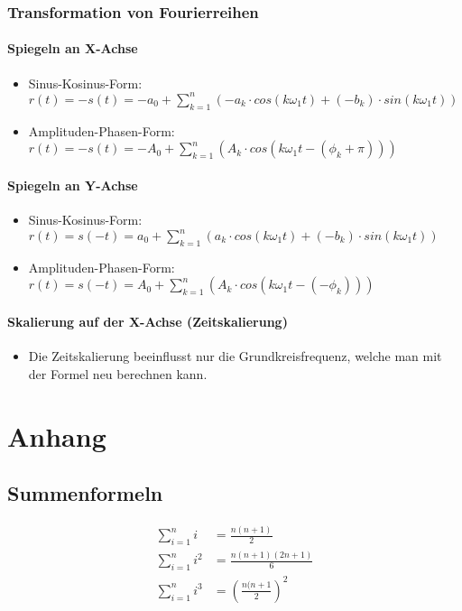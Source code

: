 \subsubsection{Transformation von Fourierreihen}
\paragraph{Spiegeln an X-Achse}
\begin{itemize}
  \item Sinus-Kosinus-Form: $r(t) = -s(t) = -a_0 + \sum_{k=1}^{n} ( -a_k \cdot
    cos(k \omega_1 t) + (-b_k) \cdot sin(k \omega_1 t))$
  \item Amplituden-Phasen-Form: $r(t) = -s(t) = -A_0 + \sum_{k=1}^{n} (A_k \cdot cos(k
  \omega_1 t  - (\phi_k + \pi)))$
\end{itemize}
\paragraph{Spiegeln an Y-Achse}
\begin{itemize}
  \item Sinus-Kosinus-Form: $r(t) = s(-t) = a_0 + \sum_{k=1}^{n} ( a_k \cdot
    cos(k \omega_1 t) + (-b_k) \cdot sin(k \omega_1 t))$
  \item Amplituden-Phasen-Form: $r(t) = s(-t) =  A_0 + \sum_{k=1}^{n}
    (A_k \cdot cos(k \omega_1 t  - (-\phi_k)))$
\end{itemize}
\paragraph{Skalierung auf der X-Achse (Zeitskalierung)}
\begin{itemize}
  \item Die Zeitskalierung beeinflusst nur die Grundkreisfrequenz,
    welche man mit der Formel neu berechnen kann.
\end{itemize}



\section{Anhang}
\subsection{Summenformeln}
\[ \begin{aligned}
  \sum_{i=1}^{n}i     & = \frac{n(n+1)}{2} \\
  \sum_{i=1}^{n}i^2   & = \frac{n(n+1)(2n+1)}{6} \\
  \sum_{i=1}^{n}i^3   & = \left(\frac{n(n+1}{2}\right)^2 \\
\end{aligned} \]
